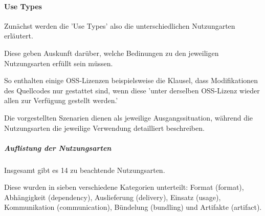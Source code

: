 \paragraph{Use Types}

Zunächst werden die 'Use Types' also die unterschiedlichen Nutzungarten erläutert. 

Diese geben Auskunft darüber, welche Bedinungen zu den jeweiligen Nutzungsarten erfüllt sein müssen. 

So enthalten einige OSS-Lizenzen beispielsweise die Klausel, dass Modifikationen des Quellcodes nur gestattet sind, wenn diese 'unter derselben OSS-Lizenz wieder allen zur Verfügung gestellt werden.'

Die vorgestellten Szenarien dienen als jeweilige Ausgangssituation, während die Nutzungsarten die jeweilige Verwendung detailliert beschreiben. 

\subparagraph{Auflistung der Nutzungsarten}

Insgesamt gibt es 14 zu beachtende Nutzungsarten.

Diese wurden in sieben verschiedene Kategorien unterteilt: Format (format), Abhängigkeit (dependency), Auslieferung (delivery), Einsatz (usage), Kommunikation (communication), Bündelung (bundling) und Artifakte (artifact). 


